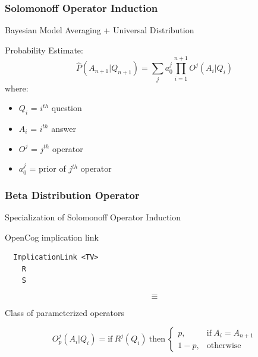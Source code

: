\documentclass{beamer}
\begin{document}
\begin{frame}
  \frametitle{Solomonoff Operator Induction}

  \begin{center}
    \alert{Bayesian Model Averaging + Universal Distribution}
  \end{center}

  Probability Estimate:
  $$
  \hat{P}(A_{n+1}|Q_{n+1}) = \sum_j a_0^j \prod_{i=1}^{n+1} O^j(A_i|Q_i)
  $$
  where:
  \begin{itemize}
  \item $Q_i$ = $i^{th}$ question
  \item $A_i$ = $i^{th}$ answer
  \item $O^j$ = $j^{th}$ operator
  \item $a^j_0$ = prior of $j^{th}$ operator
  \end{itemize}
\end{frame}

\begin{frame}[fragile]
  \frametitle{Beta Distribution Operator}

\begin{center}\alert{Specialization of Solomonoff Operator Induction}\end{center}
  
OpenCog implication link
{\small
\begin{verbatim}
  ImplicationLink <TV>
    R
    S
\end{verbatim}
}

$$
\equiv
$$

Class of parameterized operators

  $$
  O^j_p(A_i|Q_i) = \text{if}\ R^j(Q_i)\ \text{then}\
  \begin{cases}
    p, & \text{if}\ A_i = A_{n+1}\\
    1-p, & \text{otherwise}
  \end{cases}
  $$
\end{frame}
\end{document}
